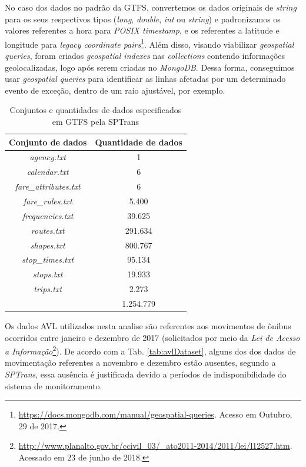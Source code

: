 \documentclass[
	12pt,				%
	oneside,			%
	a4paper,			%
	english,			%
	brazil				%
	]{abntex2ppgsi}
\begin{document}
{{No caso dos dados no padrão da GTFS, convertemos os dados originais de \textit{string} para os seus respectivos tipos (\textit{long}, \textit{double}, \textit{int} ou \textit{string}) e padronizamos os valores referentes a hora para \textit{POSIX timestamp}, e os referentes a latitude e longitude para  \textit{legacy coordinate pairs}\footnote{\label{geoMongo}\url{https://docs.mongodb.com/manual/geospatial-queries}. Acesso em Outubro, 29 de 2017.}. Além disso, visando viabilizar \textit{geospatial queries}, foram criados \textit{geospatial indexes} nas \textit{collections} contendo informações geolocalizadas, logo após serem criadas no \textit{MongoDB}. Dessa forma, conseguimos usar \textit{geospatial queries} para identificar as linhas afetadas por um determinado evento de exceção, dentro de um raio ajustável, por exemplo.

\begin{table}[!htb]
\centering
\caption{Conjuntos e quantidades de dados especificados em GTFS pela SPTrans}
	\label{tab:gtfs}
\begin{tabular}{c|c}
\toprule
\textbf{Conjunto de dados} & \textbf {Quantidade de dados} \\ 
\midrule
\textit{agency.txt} & 1 \\ 
\hline
\textit{calendar.txt} & 6 \\ 
\hline
\textit{fare\_attributes.txt} & 6 \\ 
\hline
\textit{fare\_rules.txt} & 5.400 \\
\hline
\textit{frequencies.txt} & 39.625 \\
\hline
\textit{routes.txt} & 291.634 \\
\hline
\textit{shapes.txt} & 800.767 \\
\hline
\textit{stop\_times.txt} & 95.134 \\  
\hline
\textit{stops.txt} & 19.933 \\ 
\hline
\textit{trips.txt} & 2.273 \\
\midrule
{} & 1.254.779 \\
\bottomrule
\end{tabular}
\end{table}

Os dados AVL utilizados nesta analise são referentes aos movimentos de ônibus ocorridos entre janeiro e dezembro de 2017 (solicitados por meio da \textit{Lei de Acesso a Informação}\footnote{\url{http://www.planalto.gov.br/ccivil\_03/\_ato2011-2014/2011/lei/l12527.htm}. Acessado em 23 de junho de 2018.}). De acordo com a Tab. \ref{tab:avlDataset}, alguns dos dos dados de movimentação referentes a novembro e dezembro estão ausentes, segundo a \textit{SPTrans}, essa ausência é justificada devido a períodos de indisponibilidade do sistema de monitoramento.

}}
\end{document}
